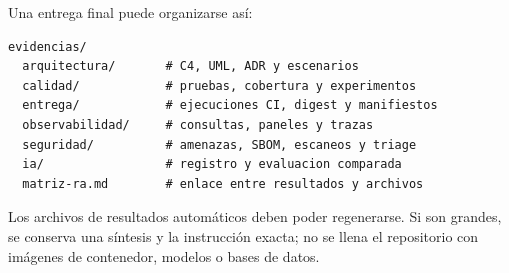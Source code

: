 Una entrega final puede organizarse así:

\begin{lstlisting}
evidencias/
  arquitectura/       # C4, UML, ADR y escenarios
  calidad/            # pruebas, cobertura y experimentos
  entrega/            # ejecuciones CI, digest y manifiestos
  observabilidad/     # consultas, paneles y trazas
  seguridad/          # amenazas, SBOM, escaneos y triage
  ia/                 # registro y evaluacion comparada
  matriz-ra.md        # enlace entre resultados y archivos
\end{lstlisting}

Los archivos de resultados automáticos deben poder regenerarse. Si son grandes, se conserva una síntesis y la instrucción exacta; no se llena el repositorio con imágenes de contenedor, modelos o bases de datos.
